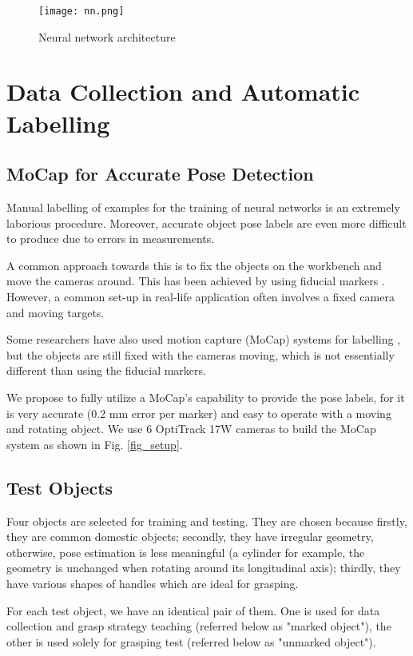\documentclass[conference]{IEEEtran}
\begin{document}
\begin{figure*}[h]
  \texttt{[image: nn.png]}
  \caption{Neural network architecture}
  \label{fig_nn}
\end{figure*}

\section{Data Collection and Automatic Labelling}
\subsection{MoCap for Accurate Pose Detection}
Manual labelling of examples for the training of neural networks is an extremely laborious procedure. Moreover, accurate object pose labels are even more difficult to produce due to errors in measurements.

A common approach towards this is to fix the objects on the workbench and move the cameras around. This has been achieved by using fiducial markers \cite{brachmann_2014_eccv}. However, a common set-up in real-life application often involves a fixed camera and moving targets.

Some researchers have also used motion capture (MoCap) systems for labelling \cite{wong_2017_iros}, but the objects are still fixed with the cameras moving, which is not essentially different than using the fiducial markers.

We propose to fully utilize a MoCap's capability to provide the pose labels, for it is very accurate (0.2 mm error per marker) and easy to operate with a moving and rotating object. We use 6 OptiTrack 17W cameras to build the MoCap system as shown in Fig. \ref{fig_setup}.

\subsection{Test Objects}
Four objects are selected for training and testing. They are chosen because firstly, they are common domestic objects; secondly, they have irregular geometry, otherwise, pose estimation is less meaningful (a cylinder for example, the geometry is unchanged when rotating around its longitudinal axis); thirdly, they have various shapes of handles which are ideal for grasping.

For each test object, we have an identical pair of them. One is used for data collection and grasp strategy teaching (referred below as "marked object"), the other is used solely for grasping test (referred below as "unmarked object").
\end{document}
